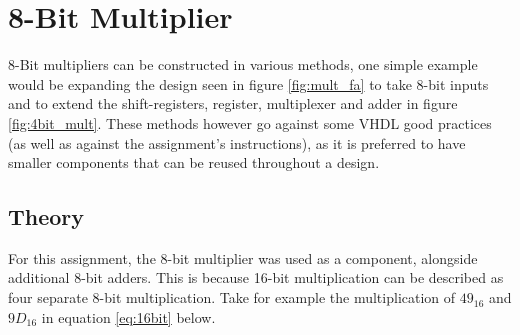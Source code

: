 \documentclass[11pt]{article}
\begin{document}
\section{8-Bit Multiplier}

8-Bit multipliers can be constructed in various methods, one simple example would be expanding the design seen in figure \ref{fig:mult_fa} to take 8-bit inputs and to extend the shift-registers, register, multiplexer and adder in figure \ref{fig:4bit_mult}.
These methods however go against some VHDL good practices (as well as against the assignment's instructions),
as it is preferred to have smaller components that can be reused throughout a design.

\subsection{Theory}

For this assignment, the 8-bit multiplier was used as a component, alongside additional 8-bit adders. 
This is because 16-bit multiplication can be described as four separate 8-bit multiplication.
Take for example the multiplication of $49_16$ and $9D_16$ in equation \ref{eq:16bit} below.
\end{document}
